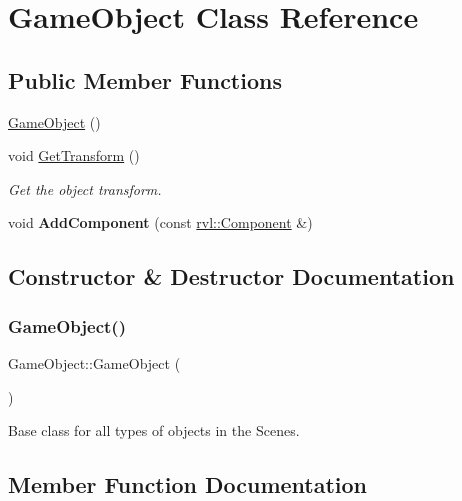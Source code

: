 \hypertarget{class_game_object}{}\section{Game\+Object Class Reference}
\label{class_game_object}
\subsection*{Public Member Functions}
\begin{DoxyCompactItemize}
\item 
\hyperlink{class_game_object_a0348e3ee2e83d56eafca7a3547f432c4}{Game\+Object} ()
\item 
void \hyperlink{class_game_object_a926ece6e0dffd42ca39a1104c42eadaf}{Get\+Transform} ()
\begin{DoxyCompactList}\small\item\em Get the object transform. \end{DoxyCompactList}\item 
\mbox{\label{class_game_object_a39f53203d46a31597b758f8e7b3eaf47}} 
void {\bfseries Add\+Component} (const \hyperlink{classrvl_1_1_component}{rvl\+::\+Component} \&)
\end{DoxyCompactItemize}


\subsection{Constructor \& Destructor Documentation}
\mbox{\label{class_game_object_a0348e3ee2e83d56eafca7a3547f432c4}} 
\subsubsection{\texorpdfstring{Game\+Object()}{GameObject()}}
{\footnotesize\ttfamily Game\+Object\+::\+Game\+Object (\begin{DoxyParamCaption}{ }\end{DoxyParamCaption})}

Base class for all types of objects in the Scenes. 

\subsection{Member Function Documentation}
\mbox{\label{class_game_object_a926ece6e0dffd42ca39a1104c42eadaf}} 

